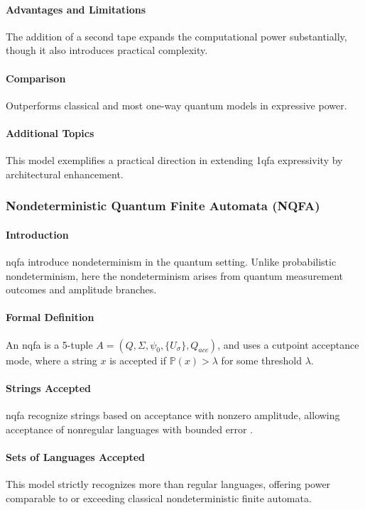 \paragraph{Advantages and Limitations}
The addition of a second tape expands the computational power substantially, though it also introduces practical complexity.

\paragraph{Comparison}
Outperforms classical and most one-way quantum models in expressive power.

\paragraph{Additional Topics}
This model exemplifies a practical direction in extending \gls{1qfa} expressivity by architectural enhancement.

\subsubsection{Nondeterministic Quantum Finite Automata (NQFA)}
\paragraph{Introduction}
\gls{nqfa} introduce nondeterminism in the quantum setting. Unlike probabilistic nondeterminism, here the nondeterminism arises from quantum measurement outcomes and amplitude branches.

\paragraph{Formal Definition}
An \gls{nqfa} is a 5-tuple \( A = (Q, \Sigma, \psi_0, \{U_\sigma\}, Q_{acc}) \), and uses a cutpoint acceptance mode, where a string \( x \) is accepted if \( \mathbb{P}(x) > \lambda \) for some threshold \( \lambda \).

\paragraph{Strings Accepted}
\gls{nqfa} recognize strings based on acceptance with nonzero amplitude, allowing acceptance of nonregular languages with bounded error \cite{yakaryilmaz2010languages}.

\paragraph{Sets of Languages Accepted}
This model strictly recognizes more than regular languages, offering power comparable to or exceeding classical nondeterministic finite automata.

